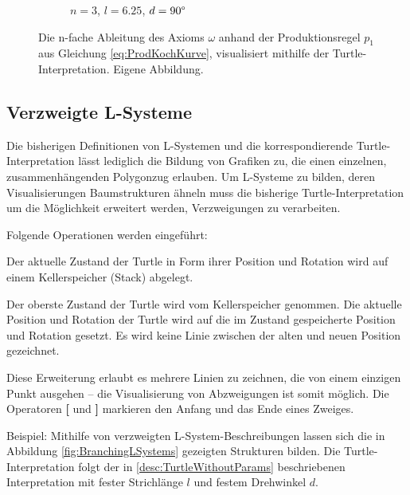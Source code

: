 \begin{figure} [hbtp]
\begin{subfigure}[t]{.4\textwidth}
		\caption{$n=3$, $l=6.25$, $d=90\degree$}
		\label{fig:KochkurveN3L6_25}
	\end{subfigure}
	\caption{Die n-fache Ableitung des Axioms $\omega$ anhand der Produktionsregel $p_1$ aus Gleichung \ref{eq:ProdKochKurve}, visualisiert mithilfe der Turtle-Interpretation. Eigene Abbildung.}
	\label{fig:KochkurveAbleitung}
\end{figure}

\subsection{Verzweigte L-Systeme} \label{subsec:BranchingLSystems}

Die bisherigen Definitionen von L-Systemen und die korrespondierende Turtle-Interpretation lässt lediglich die Bildung von Grafiken zu, die einen einzelnen, zusammenhängenden Polygonzug erlauben. Um L-Systeme zu bilden, deren Visualisierungen Baumstrukturen ähneln muss die bisherige Turtle-Interpretation um die Möglichkeit erweitert werden, Verzweigungen zu verarbeiten. \cite[S.24]{ABOP:04} 

Folgende Operationen werden eingeführt:

\begin{description}[labelindent]
	\item[\textbf{[}] Der aktuelle Zustand der Turtle in Form ihrer Position und Rotation wird auf einem Kellerspeicher (Stack) abgelegt. \\
	
	\item[\textbf{]}] Der oberste Zustand der Turtle wird vom Kellerspeicher genommen. Die aktuelle Position und Rotation der Turtle wird auf die im Zustand gespeicherte Position und Rotation gesetzt. Es wird keine Linie zwischen der alten und neuen Position gezeichnet.
\end{description}
	\cite[S.24]{ABOP:04} 

Diese Erweiterung erlaubt es mehrere Linien zu zeichnen, die von einem einzigen Punkt ausgehen -- die Visualisierung von Abzweigungen ist somit möglich. Die Operatoren \textbf{[} und \textbf{]} markieren den Anfang und das Ende eines Zweiges. \cite[S.24]{ABOP:04} 

Beispiel: Mithilfe von verzweigten L-System-Beschreibungen lassen sich die in Abbildung \ref{fig:BranchingLSystems} gezeigten Strukturen bilden. Die Turtle-Interpretation folgt der in \ref{desc:TurtleWithoutParams} beschriebenen Interpretation mit fester Strichlänge $l$ und festem Drehwinkel $d$.


